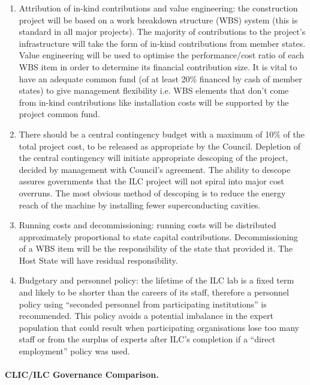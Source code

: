 \begin{enumerate}
\item Attribution of in-kind contributions and value engineering: the construction project will be based on a work breakdown structure (WBS) system (this is standard in all major projects). The majority of contributions to the project's infrastructure will take the form of in-kind contributions from member states. Value engineering will be used to optimise the performance/cost ratio of each WBS item in order to determine its financial contribution size. It is vital to have an adequate common fund (of at least 20\% financed by cash of member states) to give management flexibility i.e. WBS elements that don't come from in-kind contributions like installation costs will be supported by the project common fund.

\item There should be a central contingency budget with a maximum of 10\% of the total project cost, to be released as appropriate by the Council. Depletion of the central contingency will initiate appropriate descoping of the project, decided by management with Council's agreement. The ability to descope assures governments that the ILC project will not spiral into major cost overruns. The most obvious method of descoping is to reduce the energy reach of the machine by installing fewer superconducting cavities.

\item Running costs and decommissioning: running costs will be distributed approximately proportional to state capital contributions. Decommissioning of a WBS item will be the responsibility of the state that provided it. The Host State will have residual responsibility.

\item Budgetary and personnel policy: the lifetime of the ILC lab is a fixed term and likely to be shorter than the careers of its staff, therefore a personnel policy using ``seconded personnel from participating institutions'' is recommended. This policy avoids a potential imbalance in the expert population that could result when participating organisations lose too many staff or from the surplus of experts after ILC's completion if a ``direct employment'' policy was used.

\end{enumerate}

\paragraph{CLIC/ILC Governance Comparison.}


